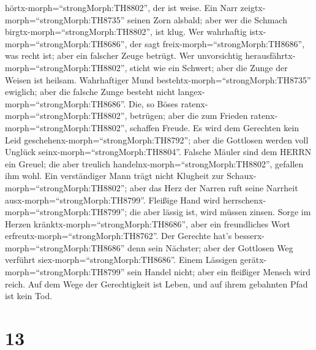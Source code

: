 hörtx-morph=``strongMorph:TH8802'', der ist weise.  Ein
Narr zeigtx-morph=``strongMorph:TH8735'' seinen Zorn alsbald; aber wer
die Schmach birgtx-morph=``strongMorph:TH8802'', ist klug. 
Wer wahrhaftig istx-morph=``strongMorph:TH8686'', der sagt
freix-morph=``strongMorph:TH8686'', was recht ist; aber ein falscher
Zeuge betrügt.  Wer unvorsichtig
herausfährtx-morph=``strongMorph:TH8802'', sticht wie ein Schwert; aber
die Zunge der Weisen ist heilsam.  Wahrhaftiger Mund
bestehtx-morph=``strongMorph:TH8735'' ewiglich; aber die falsche Zunge
besteht nicht langex-morph=``strongMorph:TH8686''.  Die, so
Böses ratenx-morph=``strongMorph:TH8802'', betrügen; aber die zum
Frieden ratenx-morph=``strongMorph:TH8802'', schaffen Freude.
 Es wird dem Gerechten kein Leid
geschehenx-morph=``strongMorph:TH8792''; aber die Gottlosen werden voll
Unglück seinx-morph=``strongMorph:TH8804''.  Falsche Mäuler
sind dem HERRN ein Greuel; die aber treulich
handelnx-morph=``strongMorph:TH8802'', gefallen ihm wohl. 
Ein verständiger Mann trägt nicht Klugheit zur
Schaux-morph=``strongMorph:TH8802''; aber das Herz der Narren ruft seine
Narrheit ausx-morph=``strongMorph:TH8799''.  Fleißige Hand
wird herrschenx-morph=``strongMorph:TH8799''; die aber lässig ist, wird
müssen zinsen.  Sorge im Herzen
kränktx-morph=``strongMorph:TH8686'', aber ein freundliches Wort
erfreutx-morph=``strongMorph:TH8762''.  Der Gerechte hat's
besserx-morph=``strongMorph:TH8686'' denn sein Nächster; aber der
Gottlosen Weg verführt siex-morph=``strongMorph:TH8686''. 
Einem Lässigen gerätx-morph=``strongMorph:TH8799'' sein Handel nicht;
aber ein fleißiger Mensch wird reich.  Auf dem Wege der
Gerechtigkeit ist Leben, und auf ihrem gebahnten Pfad ist kein Tod.

\hypertarget{section-12}{%
\section{13}\label{section-12}}

